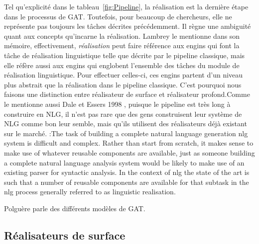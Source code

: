Tel qu'explicité dans le tableau~\ref{fig:Pipeline}, la réalisation est la dernière étape dans le processus de \ac{GAT}. Toutefois, pour beaucoup de chercheurs, elle ne représente pas toujours les tâches décrites précédemment. Il règne une ambiguité quant aux concepts qu'incarne la réalisation. Lambrey le mentionne \citep{LambreyImplementationcollocationspour2017} dans son mémoire, effectivement, \emph{réalisation} peut faire référence aux engins qui font la tâche de réalisation linguistique telle que décrite par le pipeline classique, mais elle réfère aussi aux engins qui englobent l'ensemble des tâches du module de réalisation linguistique. Pour effectuer celles-ci, ces engins partent d'un niveau plus abstrait que la réalisation dans le pipeline classique. C'est pourquoi nous faisons une distinction entre réalisateur de surface et réalisateur profond.Comme le mentionne aussi Dale et Essers 1998 \citep{EssersChoosingSurfaceRealiser1998}, puisque le pipeline est très long à construire en NLG, il n'est pas rare que des gens construisent leur système de NLG comme bon leur semble, mais qu'ils utilisent des réalisateurs déjà existant sur le marché. :The task of building a complete natural language generation nlg system is difficult and complex. Rather than start from scratch, it makes sense to make use of whatever reusable components are available, just as someone building a complete natural language analysis system would be likely to make use of an existing parser for syntactic analysis. In the context of nlg the state of the art is such that a number of reusable components are available for that subtask in the nlg process generally referred to as linguistic realisation.

Polguère \citep{PolguerePourmodelestratifie} parle des différents modèles de GAT.

\subsection{Réalisateurs de surface}

